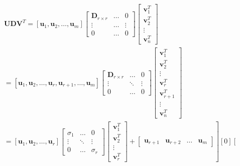 \documentclass[12pt,a4paper,oneside]{report}
\numberwithin{equation}{section}
\begin{document}
$$
\begin{aligned}
	& \mathbf{U D V}^{T}=\left[\mathbf{u}_{1}, \mathbf{u}_{2}, \ldots, \mathbf{u}_{m}\right]\left[\begin{array}{ccc}
		\mathbf{D}_{r \times r} & \ldots & 0 \\
		\vdots & \ldots & \vdots \\
		0 & \ldots & 0
	\end{array}\right]\left[\begin{array}{c}
		\mathbf{v}_{1}^{T} \\
		\mathbf{v}_{2}^{T} \\
		\vdots \\
		\mathbf{v}_{n}^{T}
	\end{array}\right] \\
	& =\left[\mathbf{u}_{1}, \mathbf{u}_{2}, \ldots, \mathbf{u}_{r}, \mathbf{u}_{r+1}, \ldots, \mathbf{u}_{m}\right]\left[\begin{array}{ccc}
		\mathbf{D}_{r \times r} & \ldots & 0 \\
		\vdots & \ddots & \vdots \\
		0 & \ldots & 0
	\end{array}\right]\left[\begin{array}{c}
		\mathbf{v}_{1}^{T} \\
		\mathbf{v}_{2}^{T} \\
		\vdots \\
		\mathbf{v}_{r}^{T} \\
		\mathbf{v}_{r+1}^{T} \\
		\vdots \\
		\mathbf{v}_{n}^{T}
	\end{array}\right] \\
	& \left.=\left[\mathbf{u}_{1}, \mathbf{u}_{2}, \ldots, \mathbf{u}_{r}\right]\left[\begin{array}{ccc}
		\sigma_{1} & \ldots & 0 \\
		\vdots & \ddots & \vdots \\
		0 & \ldots & \sigma_{r}
	\end{array}\right]\left[\begin{array}{c}
		\mathbf{v}_{1}^{T} \\
		\mathbf{v}_{2}^{T} \\
		\vdots \\
		\mathbf{v}_{r}^{T}
	\end{array}\right]+\left[\begin{array}{llll}
		\mathbf{u}_{r+1} & \mathbf{u}_{r+2} & \ldots & \mathbf{u}_{m}
	\end{array}\right]\right][0]\left[\begin{array}{c}

\end{array}
\end{aligned}$$
\end{document}
